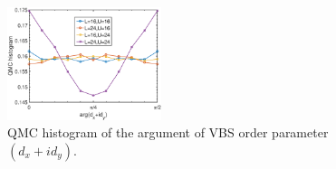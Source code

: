 \documentclass[twocolumn,superscriptaddress]{revtex4-1}
\begin{document}








\begin{figure}
  \includegraphics[width=0.4\textwidth]{histogram_vbs}
  \caption{\label{fig:histogram_vbs}QMC histogram of the argument of VBS order parameter $(d_x+id_y)$. }
\end{figure}
\end{document}
